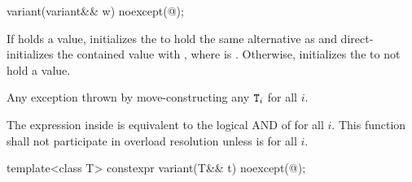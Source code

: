 %
\begin{itemdecl}
variant(variant&& w) noexcept(@\seebelow@);
\end{itemdecl}

\begin{itemdescr}
\pnum
\effects
If  holds a value, initializes the  to hold the same
alternative as  and direct-initializes the contained value with
, where  is .
Otherwise, initializes the  to not hold a value.

\pnum
\throws
Any exception thrown by move-constructing any $\texttt{T}_i$ for all $i$.

\pnum
\remarks
The expression inside  is equivalent to the logical AND of
 for all $i$.
This function shall not participate in overload resolution unless
 is  for all $i$.
\end{itemdescr}

%
\begin{itemdecl}
template<class T> constexpr variant(T&& t) noexcept(@\seebelow@);
\end{itemdecl}

